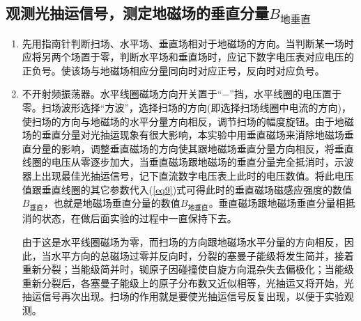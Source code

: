 \documentclass[a4paper]{article}
\begin{document}
\subsection{观测光抽运信号，测定地磁场的垂直分量$B_{\text{地垂直}}$}
\begin{enumerate}
\item 先用指南针判断扫场、水平场、垂直场相对于地磁场的方向。当判断某一场时应将另两个场置于零，判断水平场和垂直场时，应记下数字电压表对应电压的正负号。使该场与地磁场相应分量同向时对应正号，反向时对应负号。
\item 不开射频振荡器。水平线圈磁场方向开关置于“$-$”挡，水平线圈的电压置于零。扫场波形选择“方波”，选择扫场的方向(即选择扫场线圈中电流的方向)，使扫场的方向与地磁场的水平分量方向相反，调节扫场的幅度旋钮。由于地磁场的垂直分量对光抽运现象有很大影响，本实验中用垂直磁场来消除地磁场垂直分量的影响，调整垂直磁场的方向使其跟地磁场垂直分量方向相反，将垂直线圈的电压从零逐步加大，当垂直磁场跟地磁场的垂直分量完全抵消时，示波器上出现最佳光抽运信号，记下直流数字电压表上此时的电压数值。将此电压值跟垂直线圈的其它参数代入(\ref{eq9})式可得此时的垂直磁场磁感应强度的数值$B_{\text{垂直}}$，也就是地磁场垂直分量的数值$B_{\text{地垂直}}$。垂直磁场跟地磁场垂直分量相抵消的状态，在做后面实验的过程中一直保持下去。

由于这是水平线圈磁场为零，而扫场的方向跟地磁场水平分量的方向相反，因此，当水平方向的总磁场过零并反向时，分裂的塞曼子能级将发生简并，接着重新分裂；当能级简并时，铷原子因碰撞使自旋方向混杂失去偏极化；当能级重新分裂后，各塞曼子能级上的原子分布数又近似相等，光抽运又将开始，光抽运信号再次出现。扫场的作用就是要使光抽运信号反复出现，以便于实验观测。
\end{enumerate}
\end{document}
